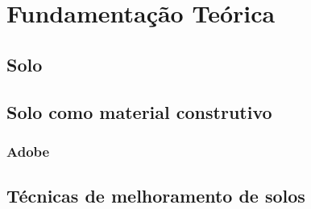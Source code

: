 \newpage

\chapter{Fundamentação Teórica}

\section{Solo}


\section{Solo como material construtivo}


\subsection{Adobe}


\section{Técnicas de melhoramento de solos}

